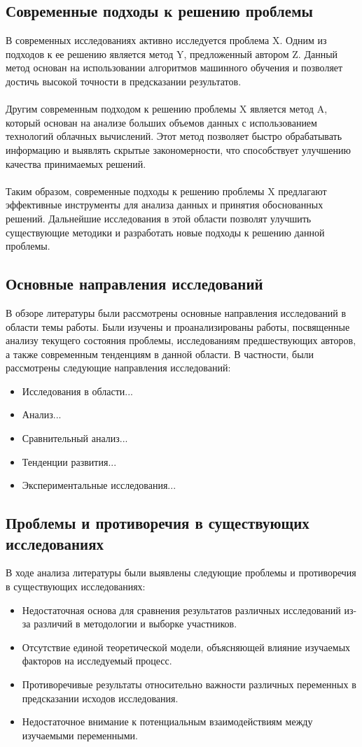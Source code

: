\documentclass{article}
\begin{document}
\subsection{Современные подходы к решению проблемы}
В современных исследованиях активно исследуется проблема X. Одним из подходов к ее решению является метод Y, предложенный автором Z. Данный метод основан на использовании алгоритмов машинного обучения и позволяет достичь высокой точности в предсказании результатов.\\
~\\
Другим современным подходом к решению проблемы X является метод A, который основан на анализе больших объемов данных с использованием технологий облачных вычислений. Этот метод позволяет быстро обрабатывать информацию и выявлять скрытые закономерности, что способствует улучшению качества принимаемых решений.\\
~\\
Таким образом, современные подходы к решению проблемы X предлагают эффективные инструменты для анализа данных и принятия обоснованных решений. Дальнейшие исследования в этой области позволят улучшить существующие методики и разработать новые подходы к решению данной проблемы.
\subsection{Основные направления исследований}
В обзоре литературы были рассмотрены основные направления исследований в области темы работы. Были изучены и проанализированы работы, посвященные анализу текущего состояния проблемы, исследованиям предшествующих авторов, а также современным тенденциям в данной области. В частности, были рассмотрены следующие направления исследований:
\begin{itemize}
\item Исследования в области...
\item Анализ...
\item Сравнительный анализ...
\item Тенденции развития...
\item Экспериментальные исследования...
\end{itemize}
\subsection{Проблемы и противоречия в существующих исследованиях}
В ходе анализа литературы были выявлены следующие проблемы и противоречия в существующих исследованиях:
\begin{itemize}
\item Недостаточная основа для сравнения результатов различных исследований из-за различий в методологии и выборке участников.
\item Отсутствие единой теоретической модели, объясняющей влияние изучаемых факторов на исследуемый процесс.
\item Противоречивые результаты относительно важности различных переменных в предсказании исходов исследования.
\item Недостаточное внимание к потенциальным взаимодействиям между изучаемыми переменными.
\end{itemize}
\end{document}
